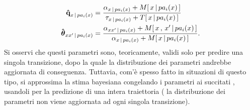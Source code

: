 \begin{equation}
\label{eq:ctbn-imaginary-params}
\begin{split}
\paramhat{q}_{x\,\arrowvert\,pa_i(\setel{x})}&=\frac{\alpha_{\setel{x}\,\arrowvert\,pa_i(\setel{x})} + \mstat{x\,\arrowvert\,pa_i(\setel{x})}}{\tau_{\setel{x}\,\arrowvert\,pa_i(\setel{x})} + \tstat{x\,\arrowvert\,pa_i(\setel{x})}} \\
\greekhat{\theta}_{xx^\prime\,\arrowvert\,pa_i(\setel{x})}&=\frac{\alpha_{\setel{x}\setel{x}^{\prime}\,\arrowvert\,pa_i(\setel{x})}+\mstat[x]{x^\prime\,\arrowvert\,pa_i(\setel{x})}}{\alpha_{\setel{x}\,\arrowvert\,pa_i(\setel{x})} + \mstat{x\,\arrowvert\,pa_i(\setel{x})}}\text{.}
\end{split}
\end{equation}
Si osservi che questi parametri sono, teoricamente, validi solo per predire una singola transizione, dopo la quale la distribuzione dei parametri andrebbe aggiornata di conseguenza. Tuttavia, com'è spesso fatto in situazioni di questo tipo, si approssima la stima bayesiana congelando i parametri ai succitati \emph{}, usandoli per la predizione di una intera traiettoria (\ie{} la distribuzione dei parametri non viene aggiornata ad ogni singola transizione).
